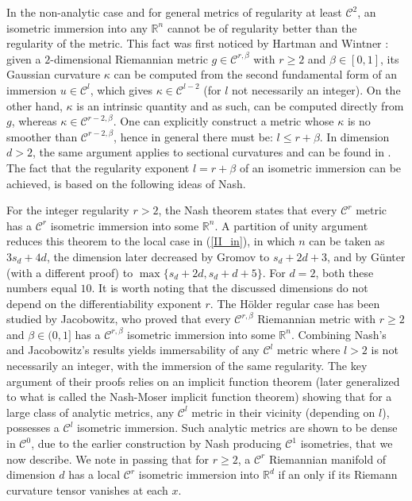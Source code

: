 \documentclass[reqno,twoside,11pt]{amsart}
\newcommand{\R}{\mathbb{R}}
\numberwithin{equation}{section}
\theoremstyle{plain}
\theoremstyle{definition}
\begin{document}
In the non-analytic case and for general metrics of regularity at least
$\mathcal{C}^2$, an isometric immersion into any
$\R^n$ cannot be of regularity better than the regularity of the
metric. This fact was first noticed by Hartman and Wintner
\cite{HarW}: given a $2$-dimensional Riemannian metric
$g\in\mathcal{C}^{r,\beta}$ with $r\geq 2$
and $\beta\in [0,1]$, its Gaussian curvature $\kappa$ can be computed from the second
fundamental form of an immersion $u\in\mathcal{C}^{l}$, which gives
$\kappa\in\mathcal{C}^{l-2}$ (for $l$ not necessarily an integer). 
On the other hand, $\kappa$ is an intrinsic quantity and as such, can be
computed directly from $g$, whereas $\kappa\in\mathcal{C}^{r-2,\beta}$. One
can explicitly construct a metric whose $\kappa$ is no smoother than
$\mathcal{C}^{r-2, \beta}$, hence in general there must be: $l\leq r+\beta$. In
dimension $d>2$, the same argument applies to sectional
curvatures and can be found in \cite{Jaco}.
The fact that the regularity exponent $l = r+\beta$ of an isometric
immersion can be achieved, is based on the following ideas of Nash.

\medskip

For the integer regularity $r>2$, the Nash theorem \cite{Nash1} states
that every $\mathcal{C}^r$ metric has a $\mathcal{C}^r$ isometric
immersion into some $\R^n$. A partition of unity argument reduces this theorem to 
the local case in (\ref{II_in}), in which $n$ can be taken as
$3s_d+4d$, the dimension later decreased by Gromov \cite{Gro_book} to
$s_d+2d+3$, and by G\"unter (with a different proof) \cite{Gun} to
$\max\{s_d+2d, s_d+d+5\}$.
For $d=2$, both these numbers equal $10$.  It is worth noting that the discussed dimensions
do not depend on the differentiability exponent $r$. 
The H\"older regular case has been studied by Jacobowitz, who proved
\cite{Jaco} that every $\mathcal{C}^{r,\beta}$ Riemannian metric with
$r\geq 2$ and $\beta\in (0,1]$ has a $\mathcal{C}^{r,\beta}$ isometric
immersion into some $\R^n$. Combining Nash's and Jacobowitz's results
yields immersability of any $\mathcal{C}^l$ metric %
where $l>2$ is not necessarily an integer, with the immersion of the
same regularity. The key argument of their proofs relies on an
implicit function theorem (later generalized to what
is called the Nash-Moser implicit function theorem)
showing that for a large class of analytic
metrics, any $\mathcal{C}^l$ metric in their vicinity (depending on
$l$), possesses a $\mathcal{C}^l$ isometric immersion. Such analytic
metrics are shown to be dense in $\mathcal{C}^0$, due to the
earlier construction by Nash producing $\mathcal{C}^1$ isometries,
that we now describe. We note in passing that for $r\geq 2$, a $\mathcal{C}^r$ Riemannian
manifold of dimension $d$ has a local $\mathcal{C}^r$ isometric
immersion into $\R^{d}$ if an only if its Riemann curvature tensor
vanishes at each $x$. 
\end{document}
